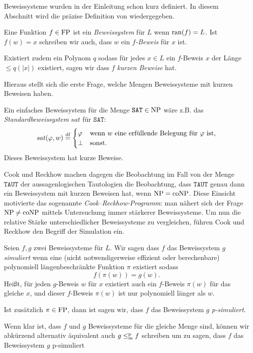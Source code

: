 Beweissysteme wurden in der Einleitung schon kurz definiert. In diesem Abschnitt wird die präzise Definition von \textcite{cook_relative_1979} wiedergegeben.
\begin{definition}
Eine Funktion $f\in \mathrm{FP}$ ist ein \emph{Beweissystem} für $L$ wenn $\operatorname{ran}(f)=L$.
Ist $f(w)=x$ schreiben wir auch, dass $w$ ein \emph{$f$-Beweis} für $x$ ist.

Existiert zudem ein Polynom $q$ sodass für jedes $x\in L$ ein $f$-Beweis $x$ der Länge $\leq q(|x|)$ existiert, sagen wir dass $f$ \emph{kurzen Beweise} hat.
\end{definition}
Hieraus stellt sich die erste Frage, welche Mengen Beweissysteme mit kurzen Beweisen haben.

Ein einfaches Beweissystem für die Menge $\mathtt{SAT}\in\mathrm{NP}$ wäre z.B. das \emph{Standardbeweissystem} $\mathit{sat}$ für $\mathtt{SAT}$:
\[ \mathit{sat}(\varphi, w) \stackrel{\text{df}}{=} \begin{cases} \varphi & \text{wenn $w$ eine erfüllende Belegung für $\varphi$ ist,} \\ \bot & \text{sonst.} \end{cases} \]
Dieses Beweissystem hat kurze Beweise.

Cook und Reckhow machen dagegen die Beobachtung im Fall von der Menge $\mathtt{TAUT}$ der aussagenlogischen Tautologien die Beobachtung, dass $\mathtt{TAUT}$ genau dann ein Beweissystem mit kurzen Beweisen hat, wenn $\mathrm{NP}=\mathrm{coNP}$.
Diese Einsicht motivierte das sogenannte \emph{Cook–Reckhow-Programm}: man nähert sich der Frage  $\mathrm{NP}\neq \mathrm{coNP}$ mittels Untersuchung immer stärkerer Beweissysteme.
Um nun die relative Stärke unterschiedlicher Beweissysteme zu vergleichen, führen Cook und Reckhow den Begriff der Simulation ein.
\begin{definition}
    Seien $f,g$ zwei Beweissysteme für $L$. Wir sagen dass $f$ das Beweissystem $g$ \emph{simuliert} wenn eine (nicht notwendigerweise effizient oder berechenbare) polynomiell längenbeschränkte Funktion $\pi$  existiert sodass 
    \[ f(\pi(w))=g(w). \]
    Heißt, für jeden $g$-Beweis $w$ für $x$ existiert auch ein $f$-Beweis $\pi(w)$ für das gleiche $x$, und dieser $f$-Beweis $\pi(w)$ ist nur polynomiell länger als $w$.

    Ist zusätzlich $\pi\in\mathrm{FP}$, dann ist sagen wir, dass $f$ das Beweissystem $g$ \emph{p-simuliert}.
\end{definition}
Wenn klar ist, dass $f$ und $g$ Beweissysteme für die gleiche Menge sind, können wir abkürzend alternativ äquivalent auch $g\leq_\mathrm{m}^\mathrm{p} f$ schreiben um zu sagen, dass $f$ das Beweissystem $g$ p-simuliert

